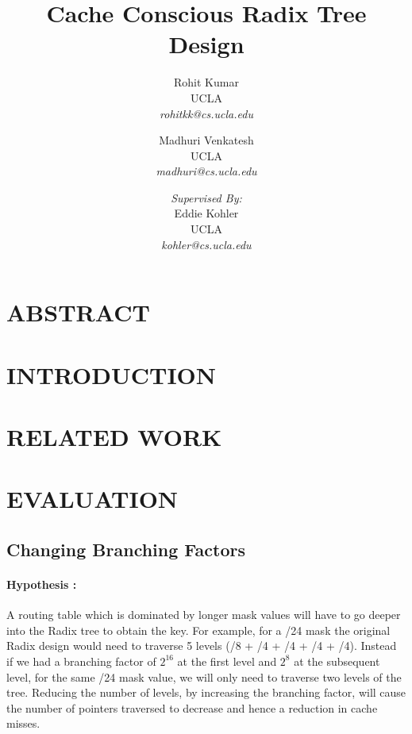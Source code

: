 \documentclass{article}
\begin{document}
\author {
  Rohit Kumar 
  \\ UCLA 
  \\ \textsl{rohitkk@cs.ucla.edu}
  \and
  Madhuri Venkatesh 
  \\ UCLA 
  \\ \textsl{madhuri@cs.ucla.edu}
  \and
  \textsl{Supervised By:}
  \\Eddie Kohler 
  \\ UCLA 
  \\ \textsl{kohler@cs.ucla.edu}
}
\title{Cache Conscious Radix Tree Design}
\maketitle
{}
\addtocounter{hyp-count}{1}
\newcommand{\hypothesis}[1]{\paragraph{Hypothesis \arabic{hyp-count}:}
  #1 \addtocounter{hyp-count}{1}}

\pagebreak
\section{ABSTRACT}
\section{INTRODUCTION}
\section{RELATED WORK}
\section{EVALUATION}

\subsection{Changing Branching Factors}

\hypothesis{
A routing table which is dominated by longer mask values will have to
go deeper into the Radix tree to obtain the key. For example, for a
/24 mask the original Radix design would need to traverse 5 levels (/8
+ /4 + /4 + /4 + /4). Instead if we had a branching factor of $2^{16}$
at the first level and $2^{8}$ at the subsequent level, for the same
/24 mask value, we will only need to traverse two levels of the
tree. Reducing the number of levels, by increasing the branching
factor,  will cause the number of pointers
traversed to decrease and hence a reduction in cache misses. 
} 
\end{document}
